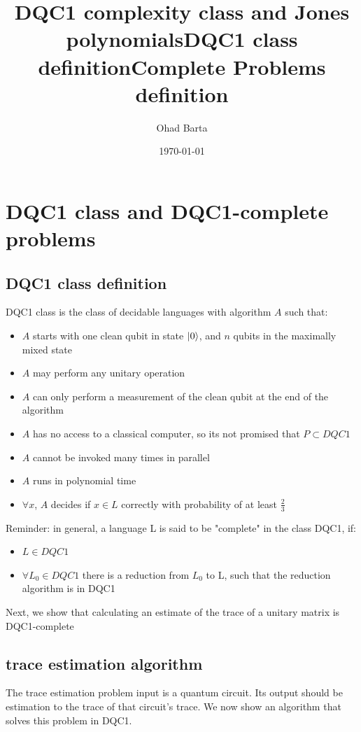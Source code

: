 \documentclass{article}
\begin{document}
\title{DQC1 complexity class and Jones polynomials} 
\author{Ohad Barta}
\date{\today} 

\titlepage
\tableofcontents



\section{DQC1 class and DQC1-complete problems}
\subsection{DQC1 class definition  } 
\title{DQC1 class definition} 
DQC1 class is the class of decidable languages with algorithm $A$ such that:
\begin{itemize}
\item $A$ starts with one clean qubit in state $\left\vert{0}\right\rangle$, and $n$ qubits in the maximally mixed state
\item $A$ may perform any unitary operation
\item $A$ can only perform a measurement of the clean qubit at the end of the algorithm
\item $A$ has no access to a classical computer, so its not promised that $P \subset DQC1$ 
\item $A$ cannot be invoked many times in parallel
\item $A$ runs in polynomial time
\item $\forall x$, $A$ decides if $x \in L$ correctly with probability of at least $\frac{2}{3}$
\end{itemize}


\title{Complete Problems definition} 
Reminder: in general, a language L is said to be "complete" in the class DQC1, if:
\begin{itemize}
\item $L \in DQC1$
\item $\forall L_{0} \in DQC1$ there is a reduction from $L_{0}$ to L, such that the reduction algorithm is in DQC1  
\end{itemize}
Next, we show that calculating an estimate of the trace of a unitary matrix is DQC1-complete


\subsection{trace estimation algorithm  }

The trace estimation problem input is a quantum circuit. Its output should be estimation to the trace of that circuit's trace.
We now show an algorithm that solves this problem in DQC1.
\end{document}
